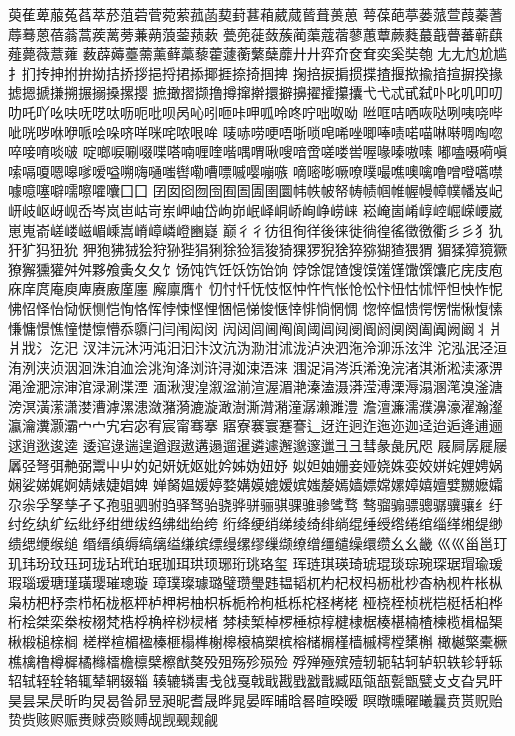 萸萑萆菔菟萏萃菸菹菪菅菀萦菰菡葜葑葚葙葳蒇蒈葺蒉葸
萼葆葩葶蒌蒎萱葭蓁蓍蓐蓦蒽蓓蓊蒿蒺蓠蒡蒹蒴蒗蓥蓣蔌
甍蔸蓰蔹蔟蔺蕖蔻蓿蓼蕙蕈蕨蕤蕞蕺瞢蕃蕲蕻薤薨薇薏蕹
薮薜薅薹薷薰藓藁藜藿蘧蘅蘩蘖蘼⼶廾弈夼奁耷奕奚奘匏
⼪尢尥尬尴扌扪抟抻拊拚拗拮挢拶挹捋捃掭揶捱捺掎掴捭
掬掊捩掮掼揲揸揠揿揄揞揎摒揆掾摅摁搋搛搠搌搦搡摞撄
摭撖摺撷撸撙撺擀擐擗擤擢攉攥攮⼷弋忒甙弑卟叱叽叩叨
叻吒吖吆呋呒呓呔呖呃吡呗呙吣吲咂咔呷呱呤咚咛咄呶呦
咝哐咭哂咴哒咧咦哓哔呲咣哕咻咿哌哙哚哜咩咪咤哝哏哞
唛哧唠哽唔哳唢唣唏唑唧唪啧喏喵啉啭啁啕唿啐唼唷啖啵
啶啷唳唰啜喋嗒喃喱喹喈喁喟啾嗖喑啻嗟喽喾喔喙嗪嗷嗉
嘟嗑嗫嗬嗔嗦嗝嗄嗯嗥嗲嗳嗌嗍嗨嗵嗤辔嘞嘈嘌嘁嘤嘣嗾
嘀嘧嘭噘嘹噗嘬噍噢噙噜噌噔嚆噤噱噫噻噼嚅嚓嚯囔⼞囗
囝囡囵囫囹囿圄圊圉圜帏帙帔帑帱帻帼帷幄幔幛幞幡岌屺
岍岐岖岈岘岙岑岚岜岵岢岽岬岫岱岣峁岷峄峒峤峋峥崂崃
崧崦崮崤崞崆崛嵘崾崴崽嵬嵛嵯嵝嵫嵋嵊嵩嵴嶂嶙嶝豳嶷
巅⼻彳彷徂徇徉後徕徙徜徨徭徵徼衢⼺彡犭犰犴犷犸狃狁
狎狍狒狨狯狩狲狴狷猁狳猃狺狻猗猓猡猊猞猝猕猢猹猥猬
猸猱獐獍獗獠獬獯獾⾇舛夥飧夤⼡夂饣饧饨饩饪饫饬饴饷
饽馀馄馇馊馍馐馑馓馔馕庀庑庋庖庥庠庹庵庾庳赓廒廑廛
廨廪膺忄忉忖忏怃忮怄忡忤忾怅怆忪忭忸怙怵怦怛怏怍怩
怫怊怿怡恸恹恻恺恂恪恽悖悚悭悝悃悒悌悛惬悻悱惝惘惆
惚悴愠愦愕愣惴愀愎愫慊慵憬憔憧憷懔懵忝隳闩闫闱闳闵
闶闼闾阃阄阆阈阊阋阌阍阏阒阕阖阗阙阚丬⽙爿戕氵汔汜
汊沣沅沐沔沌汨汩汴汶沆沩泐泔沭泷泸泱泗沲泠泖泺泫泮
沱泓泯泾洹洧洌浃浈洇洄洙洎洫浍洮洵洚浏浒浔洳涑浯涞
涠浞涓涔浜浠浼浣渚淇淅淞渎涿淠渑淦淝淙渖涫渌涮渫湮
湎湫溲湟溆湓湔渲渥湄滟溱溘滠漭滢溥溧溽溻溷滗溴滏溏
滂溟潢潆潇漤漕滹漯漶潋潴漪漉漩澉澍澌潸潲潼潺濑濉澧
澹澶濂濡濮濞濠濯瀚瀣瀛瀹瀵灏灞⼧宀宄宕宓宥宸甯骞搴
寤寮褰寰蹇謇辶迓迕迥迮迤迩迦迳迨逅逄逋逦逑逍逖逡逵
逶逭逯遄遑遒遐遨遘遢遛暹遴遽邂邈邃邋⼹彐彗彖彘尻咫
屐屙孱屣屦羼弪弩弭艴弼鬻⼬屮妁妃妍妩妪妣妗姊妫妞妤
姒妲妯姗妾娅娆姝娈姣姘姹娌娉娲娴娑娣娓婀婧婊婕娼婢
婵胬媪媛婷婺媾嫫媲嫒嫔媸嫠嫣嫱嫖嫦嫘嫜嬉嬗嬖嬲嬷孀
尕尜孚孥孳孑孓孢驵驷驸驺驿驽骀骁骅骈骊骐骒骓骖骘骛
骜骝骟骠骢骣骥骧纟纡纣纥纨纩纭纰纾绀绁绂绉绋绌绐绔
绗绛绠绡绨绫绮绯绱绲缍绶绺绻绾缁缂缃缇缈缋缌缏缑缒
缗缙缜缛缟缡缢缣缤缥缦缧缪缫缬缭缯缰缱缲缳缵⼳幺畿
⼮巛甾邕玎玑玮玢玟珏珂珑玷玳珀珉珈珥珙顼琊珩珧珞玺
珲琏琪瑛琦琥琨琰琮琬琛琚瑁瑜瑗瑕瑙瑷瑭瑾璜璎璀璁璇
璋璞璨璩璐璧瓒璺韪韫韬杌杓杞杈杩枥枇杪杳枘枧杵枨枞
枭枋杷杼柰栉柘栊柩枰栌柙枵柚枳柝栀柃枸柢栎柁柽栲栳
桠桡桎桢桄桤梃栝桕桦桁桧桀栾桊桉栩梵梏桴桷梓桫棂楮
棼椟椠棹椤棰椋椁楗棣椐楱椹楠楂楝榄楫榀榘楸椴槌榇榈
槎榉楦楣楹榛榧榻榫榭槔榱槁槊槟榕槠榍槿樯槭樗樘橥槲
橄樾檠橐橛樵檎橹樽樨橘橼檑檐檩檗檫猷獒殁殂殇殄殒殓
殍殚殛殡殪轫轭轱轲轳轵轶轸轷轹轺轼轾辁辂辄辇辋辍辎
辏辘辚軎戋戗戛戟戢戡戥戤戬臧瓯瓴瓿甏甑甓⽁攴旮旯旰
昊昙杲昃昕昀炅曷昝昴昱昶昵耆晟晔晁晏晖晡晗晷暄暌暧
暝暾曛曜曦曩贲贳贶贻贽赀赅赆赈赉赇赍赕赙觇觊觋觌觎
